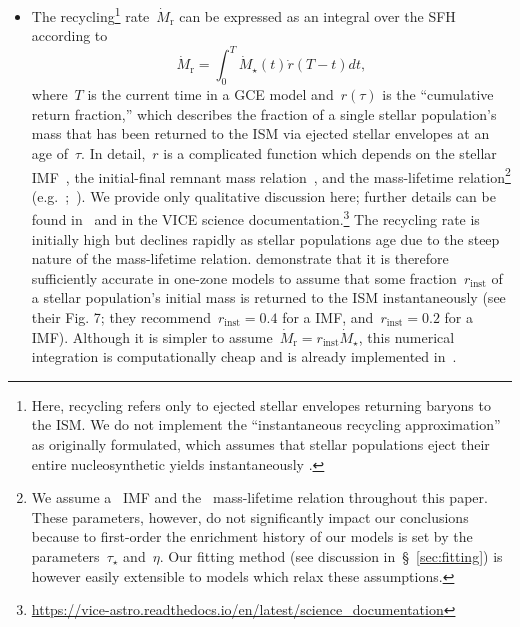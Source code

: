 \documentclass[ms.tex]{subfiles}
\begin{document}
\begin{itemize}
	\item The recycling\footnote{
		Here, recycling refers only to ejected stellar envelopes returning
		baryons to the ISM.
		We do not implement the ``instantaneous recycling approximation'' as
		originally formulated, which assumes that stellar populations eject
		their entire nucleosynthetic yields instantaneously
		\citep[see, e.g., the review in][]{Tinsley1980}.
	} rate~$\dot{M}_\text{r}$ can be expressed as an integral over the SFH
	according to
	\begin{equation}
	\dot{M}_\text{r} = \int_0^T \dot{M}_\star(t)\dot{r}(T - t)dt,
	\label{eq:mdot_recycled}
	\end{equation}
	where~$T$ is the current time in a GCE model and~$r(\tau)$ is the
	``cumulative return fraction,'' which describes the fraction of a single
	stellar population's mass that has been returned to the ISM via ejected
	stellar envelopes at an age of~$\tau$.
	In detail,~$r$ is a complicated function which depends on the stellar
	IMF~\citep[e.g.][]{Salpeter1955, Miller1979, Kroupa2001, Chabrier2003},
	the initial-final remnant mass relation~\citep[e.g.][]{Kalirai2008},
	and the mass-lifetime relation\footnote{
		We assume a~\citet{Kroupa2001} IMF and the~\citet{Larson1974}
		mass-lifetime relation throughout this paper.
		These parameters, however, do not significantly impact our conclusions
		because to first-order the enrichment history of our models is
		set by the parameters~$\tau_\star$ and~$\eta$.
		Our fitting method (see discussion in~\S~\ref{sec:fitting}) is
		however easily extensible to models which relax these assumptions.
	} (e.g.~\citealp{Larson1974, Maeder1989};~\citealp*{Hurley2000}).
	We provide only qualitative discussion here; further details can be found
	in~\citet{Weinberg2017} and in the VICE science documentation.\footnote{
		\url{https://vice-astro.readthedocs.io/en/latest/science_documentation}
	}
	The recycling rate is initially high but declines rapidly as stellar
	populations age due to the steep nature of the mass-lifetime relation.
	\citet{Weinberg2017} demonstrate that it is therefore sufficiently accurate
	in one-zone models to assume that some fraction~$r_\text{inst}$ of a
	stellar population's initial mass is returned to the ISM instantaneously
	(see their Fig. 7; they recommend~$r_\text{inst} = 0.4$ for a
	\citealt{Kroupa2001} IMF, and~$r_\text{inst} = 0.2$ for
	a~\citealt{Salpeter1955} IMF).
	Although it is simpler to assume~$\dot{M}_\text{r} =
	r_\text{inst}\dot{M}_\star$, this numerical integration is computationally
	cheap and is already implemented in~\vice.


\end{itemize}
\end{document}
